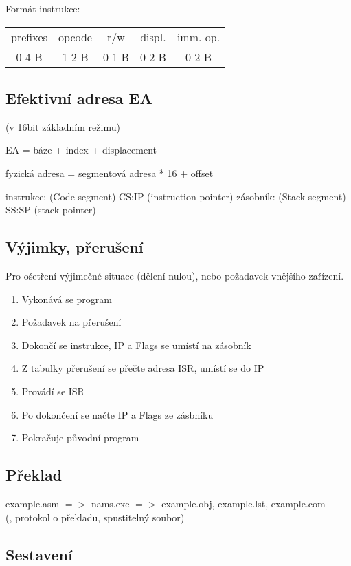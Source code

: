 \documentclass[a4wide]{report}
\begin{document}
Formát instrukce:

\begin{tabular}{ *{5}{ | c} |}
	\hline
	prefixes 	& opcode	& r/w	& displ. & imm. op. \\
	0-4 B		& 1-2 B	& 0-1 B & 0-2 B & 0-2 B \\
	\hline
\end{tabular}

\subsection{Efektivní adresa EA}

(v 16bit základním režimu)

EA = báze + index + displacement

fyzická adresa = segmentová adresa * 16 + offset

instrukce: (Code segment) CS:IP (instruction pointer)
zásobník: (Stack segment) SS:SP (stack pointer)

\subsection{Výjimky, přerušení}

Pro ošetření výjimečné situace (dělení nulou), nebo požadavek vnějšího zařízení.

\begin{enumerate}
	\item Vykonává se program
	\item Požadavek na přerušení
	\item Dokončí se instrukce, IP a Flags se umístí na zásobník
	\item Z tabulky přerušení se přečte adresa ISR, umístí se do IP
	\item Provádí se ISR
	\item Po dokončení se načte IP a Flags ze zásbníku
	\item Pokračuje původní program
\end{enumerate}

\subsection{Překlad}

example.asm $=>$ nams.exe $=>$ example.obj, example.lst, example.com\\
 (, protokol o překladu, spustitelný soubor)

\subsection{Sestavení}
\end{document}
